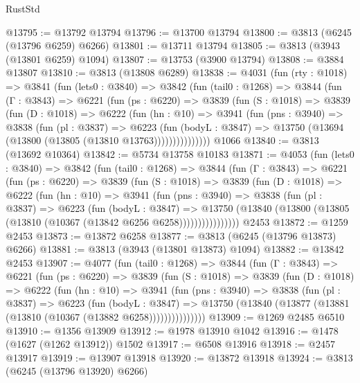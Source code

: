 \begin{lexlean}{RustStd}
\begin{coremodule}
{\begin{coremodule}
{{{{{{{{{{{{{{{{{{{{{{{{{{{{{{{{{{{@13795 := @13792 @13794
@13796 := @13700 @13794
@13800 := @3813 (@6245 (@13796 @6259) @6266)
@13801 := @13711 @13794
@13805 := @3813 (@3943 (@13801 @6259) @1094)
@13807 := @13753 (@3900 @13794)
@13808 := @3884 @13807
@13810 := @3813 (@13808 @6289)
@13838 := @4031
    (fun (rty : @1018) =>
    @3841
      (fun (lets0 : @3840) =>
      @3842
        (fun (tail0 : @1268) =>
        @3844
          (fun (Γ : @3843) =>
          @6221
            (fun (ps : @6220) =>
            @3839
              (fun (S : @1018) =>
              @3839
                (fun (D : @1018) =>
                @6222
                  (fun (hn : @10) =>
                  @3941
                    (fun (pns : @3940) =>
                    @3838
                      (fun (pl : @3837) =>
                      @6223
                        (fun (bodyL : @3847) =>
                        @13750 (@13694 (@13800 (@13805 (@13810 @13763)))))))))))))))
    @1066
@13840 := @3813 (@13692 @10364)
@13842 := @5734 @13758 @10183
@13871 := @4053
    (fun (lets0 : @3840) =>
    @3842
      (fun (tail0 : @1268) =>
      @3844
        (fun (Γ : @3843) =>
        @6221
          (fun (ps : @6220) =>
          @3839
            (fun (S : @1018) =>
            @3839
              (fun (D : @1018) =>
              @6222
                (fun (hn : @10) =>
                @3941
                  (fun (pns : @3940) =>
                  @3838
                    (fun (pl : @3837) =>
                    @6223
                      (fun (bodyL : @3847) =>
                      @13750
                        (@13840 (@13800 (@13805 (@13810 (@10367 (@13842 @6256 @6258))))))))))))))))
    @2453
@13872 := @1259 @2453
@13873 := @13872 @6258
@13877 := @3813 (@6245 (@13796 @13873) @6266)
@13881 := @3813 (@3943 (@13801 @13873) @1094)
@13882 := @13842 @2453
@13907 := @4077
    (fun (tail0 : @1268) =>
    @3844
      (fun (Γ : @3843) =>
      @6221
        (fun (ps : @6220) =>
        @3839
          (fun (S : @1018) =>
          @3839
            (fun (D : @1018) =>
            @6222
              (fun (hn : @10) =>
              @3941
                (fun (pns : @3940) =>
                @3838
                  (fun (pl : @3837) =>
                  @6223
                    (fun (bodyL : @3847) =>
                    @13750 (@13840 (@13877 (@13881 (@13810 (@10367 (@13882 @6258)))))))))))))))
@13909 := @1269 @2485 @6510
@13910 := @1356 @13909
@13912 := @1978 @13910 @1042
@13916 := @1478 (@1627 (@1262 @13912)) @1502
@13917 := @6508 @13916
@13918 := @2457 @13917
@13919 := @13907 @13918
@13920 := @13872 @13918
@13924 := @3813 (@6245 (@13796 @13920) @6266)
}}}}}}}}}}}}}}}}}}}}}}}}}}}}}}}}}}}
\end{coremodule}}
\end{coremodule}
\end{lexlean}
